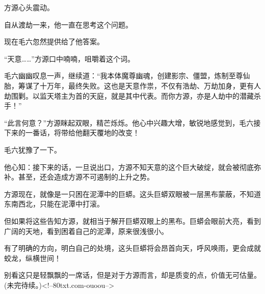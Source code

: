 \begin{this_body}
方源心头震动。

自从渡劫一来，他一直在思考这个问题。

现在毛六忽然提供给了他答案。

“天意……”方源口中喃喃，咀嚼着这个词。

毛六幽幽叹息一声，继续道：“我本体魔尊幽魂，创建影宗、僵盟，炼制至尊仙胎，筹谋了十万年，最终失败。这也是天意作祟，不仅有浩劫、万劫加身，更有人劫围剿。以监天塔主为首的天庭，就是其中代表。而你方源，亦是人劫中的潜藏杀手！”

“此言何意？”方源眯起双眼，精芒烁烁。他心中兴趣大增，敏锐地感觉到，毛六接下来的一番话，将带给他翻天覆地的改变！

毛六犹豫了一下。

他心知：接下来的话，一旦说出口，方源不知天意的这个巨大破绽，就会被彻底弥补。甚至，还会造成方源不可遏制的上升之势。

方源现在，就像是一只困在泥潭中的巨蟒。这头巨蟒双眼被一层黑布蒙蔽，不知道东南西北，只能在泥潭中打滚。

但如果将这些告知方源，就相当于解开巨蟒双眼上的黑布。巨蟒会眼前大亮，看到广阔的天地，看到困着自己的泥潭，原来很浅很小。

有了明确的方向，明白自己的处境，这头巨蟒将会昂首向天，呼风唤雨，更会成就蛟龙，纵横世间！

别看这只是轻飘飘的一席话，但是对于方源而言，却是质变的点，价值无可估量。(未完待续。)<!--80txt.com-ouoou-->

\end{this_body}

